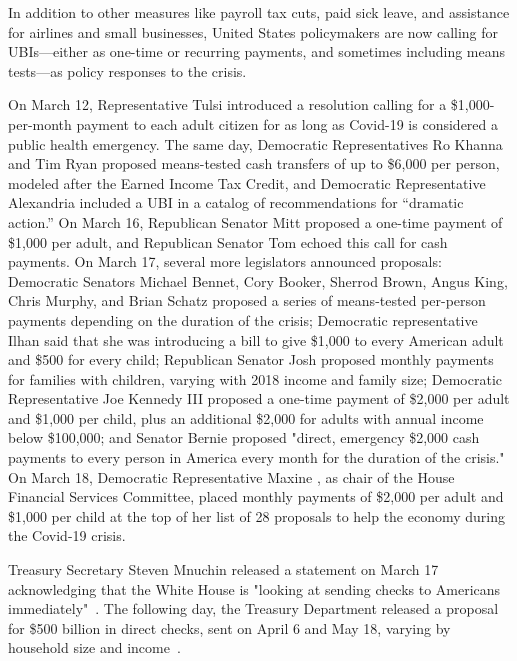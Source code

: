 \documentclass[12pt]{article}
\begin{document}
In addition to other measures like payroll tax cuts, paid sick leave, and assistance for airlines and small businesses, United States policymakers are now calling for UBIs---either as one-time or recurring payments, and sometimes including means tests---as policy responses to the crisis.

On March 12, Representative Tulsi  introduced a resolution calling for a \$1,000-per-month payment to each adult citizen for as long as Covid-19 is considered a public health emergency. The same day, Democratic Representatives Ro Khanna and Tim Ryan \citeyear{khanna_ryan} proposed means-tested cash transfers of up to \$6,000 per person, modeled after the Earned Income Tax Credit, and Democratic Representative Alexandria  included a UBI in a catalog of recommendations for “dramatic action.”  On March 16, Republican Senator Mitt  proposed a one-time payment of \$1,000 per adult, and Republican Senator Tom  echoed this call for cash payments. On March 17, several more legislators announced proposals: Democratic Senators Michael Bennet, Cory Booker, Sherrod Brown, Angus King, Chris Murphy, and Brian Schatz \citeyear{bennet} proposed a series of means-tested per-person payments depending on the duration of the crisis; Democratic representative Ilhan  said that she was introducing a bill to give \$1,000 to every American adult and \$500 for every child; Republican Senator Josh  proposed monthly payments for families with children, varying with 2018 income and family size; Democratic Representative Joe Kennedy III \citeyear{iii_2020} proposed a one-time payment of \$2,000 per adult and \$1,000 per child, plus an additional \$2,000 for adults with annual income below \$100,000; and Senator Bernie  proposed "direct, emergency \$2,000 cash payments to every person in America every month for the duration of the crisis." On March 18, Democratic Representative Maxine , as chair of the House Financial Services Committee, placed monthly payments of \$2,000 per adult and \$1,000 per child at the top of her list of 28 proposals to help the economy during the Covid-19 crisis.

Treasury Secretary Steven Mnuchin released a statement on March 17 acknowledging that the White House is "looking at sending checks to Americans immediately"~\cite{matthews_2020}. The following day, the Treasury Department released a proposal for \$500 billion in direct checks, sent on April 6 and May 18, varying by household size and income~\cite{nyt_500b}.
\end{document}
